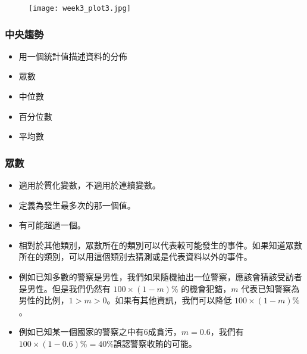 \documentclass{beamer}
\begin{document}
\begin{frame}
\begin{figure}
\begin{center}
\texttt{[image: week3\_plot3.jpg]}
\end{center}
\end{figure}
\end{frame}
\begin{frame}\frametitle{中央趨勢}
\begin{itemize}
\item 用一個統計值描述資料的分佈
\item 眾數
\item 中位數
\item 百分位數
\item 平均數
\end{itemize}
\end{frame}
\begin{frame}\frametitle{眾數}
\begin{itemize}
\item 適用於質化變數，不適用於連續變數。
\item 定義為發生最多次的那一個值。
\item 有可能超過一個。
\item 相對於其他類別，眾數所在的類別可以代表較可能發生的事件。如果知道眾數所在的類別，可以用這個類別去猜測或是代表資料以外的事件。
\item 例如已知多數的警察是男性，我們如果隨機抽出一位警察，應該會猜該受訪者是男性。但是我們仍然有 $100\times (1-m)\%$ 的機會犯錯，$m$ 代表已知警察為男性的比例，$1>m>0$。如果有其他資訊，我們可以降低 $100\times (1-m)\%$。
\item 例如已知某一個國家的警察之中有6成貪污，$m=0.6$，我們有$100\times (1-0.6)\%=40\%$誤認警察收賄的可能。
\end{itemize}
\end{frame}
\end{document}
